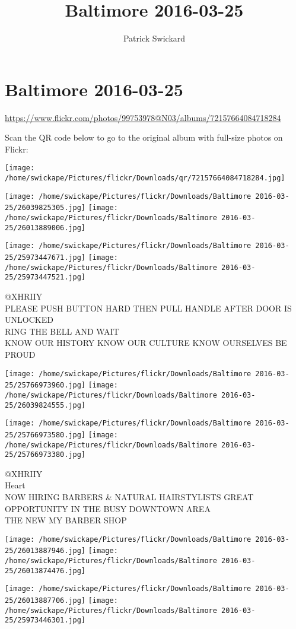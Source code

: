 \documentclass[10pt,letterpaper]{article}
\title{Baltimore 2016-03-25}
\author{Patrick Swickard}
\date{}
\begin{document}
\section*{Baltimore 2016-03-25}

\url{https://www.flickr.com/photos/99753978@N03/albums/72157664084718284}

Scan the QR code below to go to the original album with full-size photos on Flickr:

\texttt{[image: /home/swickape/Pictures/flickr/Downloads/qr/72157664084718284.jpg]}
\pagebreak

\texttt{[image: /home/swickape/Pictures/flickr/Downloads/Baltimore 2016-03-25/26039825305.jpg]}
\texttt{[image: /home/swickape/Pictures/flickr/Downloads/Baltimore 2016-03-25/26013889006.jpg]}

\texttt{[image: /home/swickape/Pictures/flickr/Downloads/Baltimore 2016-03-25/25973447671.jpg]}
\texttt{[image: /home/swickape/Pictures/flickr/Downloads/Baltimore 2016-03-25/25973447521.jpg]}

@XHRIIY\\
PLEASE PUSH BUTTON HARD THEN PULL HANDLE AFTER DOOR IS UNLOCKED\\
RING THE BELL AND WAIT\\
KNOW OUR HISTORY KNOW OUR CULTURE KNOW OURSELVES BE PROUD
\pagebreak

\texttt{[image: /home/swickape/Pictures/flickr/Downloads/Baltimore 2016-03-25/25766973960.jpg]}
\texttt{[image: /home/swickape/Pictures/flickr/Downloads/Baltimore 2016-03-25/26039824555.jpg]}

\texttt{[image: /home/swickape/Pictures/flickr/Downloads/Baltimore 2016-03-25/25766973580.jpg]}
\texttt{[image: /home/swickape/Pictures/flickr/Downloads/Baltimore 2016-03-25/25766973380.jpg]}

@XHRIIY\\
Heart\\
NOW HIRING BARBERS \& NATURAL HAIRSTYLISTS GREAT OPPORTUNITY IN THE BUSY DOWNTOWN AREA\\
THE NEW MY BARBER SHOP
\pagebreak

\texttt{[image: /home/swickape/Pictures/flickr/Downloads/Baltimore 2016-03-25/26013887946.jpg]}
\texttt{[image: /home/swickape/Pictures/flickr/Downloads/Baltimore 2016-03-25/26013874476.jpg]}

\texttt{[image: /home/swickape/Pictures/flickr/Downloads/Baltimore 2016-03-25/26013887706.jpg]}
\texttt{[image: /home/swickape/Pictures/flickr/Downloads/Baltimore 2016-03-25/25973446301.jpg]}
\end{document}
